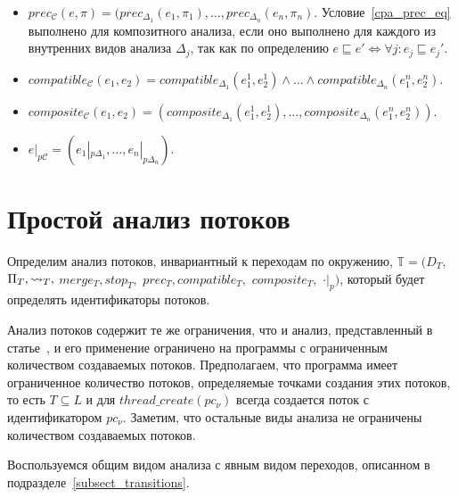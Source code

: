\begin{itemize}
\item 
$prec_{\mathscr{C}}(e,\pi)=(prec_{\Delta_1}(e_1, \pi_1), \dots, prec_{\Delta_n}(e_n, \pi_n)$. Условие~\ref{cpa_prec_eq} выполнено для композитного анализа, если оно выполнено для каждого из внутренних видов анализа $\Delta_j$, так как по определению $e \sqsubseteq e' \iff \forall j: e_j \sqsubseteq e_j'$.

\item 
$compatible_{\mathscr{C}}(e_1, e_2) = compatible_{\Delta_1}(e^1_1, e^1_2) \land \dots \land compatible_{\Delta_n}(e^n_1, e^n_2)$.

\item 
$composite_{\mathscr{C}}(e_1, e_2) = (composite_{\Delta_1}(e^1_1, e^1_2), \dots, composite_{\Delta_n}(e^n_1, e^n_2))$.

\item 
$e|_{p\mathscr{C}} = (e_1|_{p\Delta_1}, \dots, e_n|_{p\Delta_n})$.

\end{itemize}

\section{Простой анализ потоков}
\label{sect_thread_analysis}
Определим анализ потоков, инвариантный к переходам по окружению, 
$\mathbb{T}=(D_{T},$ $\Pi_{T}, \leadsto_{T},$ $merge_{T}, stop_{T},$ $prec_{T}, compatible_{T},$ $composite_{T},$ $\cdot|_p)$, который будет определять идентификаторы потоков.

Анализ потоков содержит те же ограничения, что и анализ, представленный в статье~\cite{ThreadModular03}, и его применение ограничено на программы с ограниченным количеством создаваемых потоков.
Предполагаем, что программа имеет ограниченное количество потоков, определяемые точками создания этих потоков, то есть $T\subseteq L$ и для $thread\_create(pc_\nu)$ всегда создается поток с идентификатором $pc_\nu$.
Заметим, что остальные виды анализа не ограничены количеством создаваемых потоков.

Воспользуемся общим видом анализа с явным видом переходов, описанном в подразделе~\ref{subsect_transitions}.

